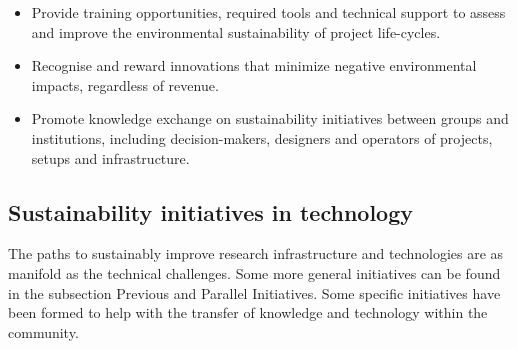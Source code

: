 \documentclass[../SustainableHEP.tex]{subfiles}
\begin{document}
\begin{reco2}{\currentname}
{\begin{itemize}[leftmargin=6 mm]
\item Provide training opportunities, required tools and technical support to assess and improve the environmental sustainability of project life-cycles.

\item Recognise and reward innovations that minimize negative environmental impacts, regardless of revenue.

\item Promote knowledge exchange on sustainability initiatives between groups and institutions, including decision-makers, designers and operators of projects, setups and infrastructure.

\end{itemize}
}

\end{reco2}



\subsection{Sustainability initiatives in technology}
The paths to sustainably improve research infrastructure and technologies are as manifold as the technical challenges. Some more general initiatives can be found in the subsection {Previous and Parallel Initiatives}. Some specific initiatives have been formed to help with the transfer of knowledge and technology within the community.
\end{document}
